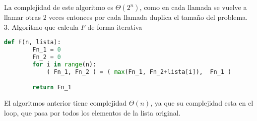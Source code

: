 \documentclass[
	spanish, %
	letterpaper, oneside
]{article}
\begin{document}
La complejidad de este algoritmo es $\Theta(2^n)$, como en cada llamada se vuelve a llamar otras 2 veces entonces por cada llamada duplica el tamaño del problema.\\


3. Algoritmo que calcula $F$ de forma iterativa

\begin{lstlisting}[language=Python]
    def F(n, lista):
        Fn_1 = 0
        Fn_2 = 0
        for i in range(n):
            ( Fn_1, Fn_2 ) = ( max(Fn_1, Fn_2+lista[i]),  Fn_1 )

        return Fn_1

\end{lstlisting}
El algoritmos anterior tiene complejidad $\Theta(n)$, ya que su complejidad esta en el loop, que pasa por todos los elementos de la lista original.

\end{document}
